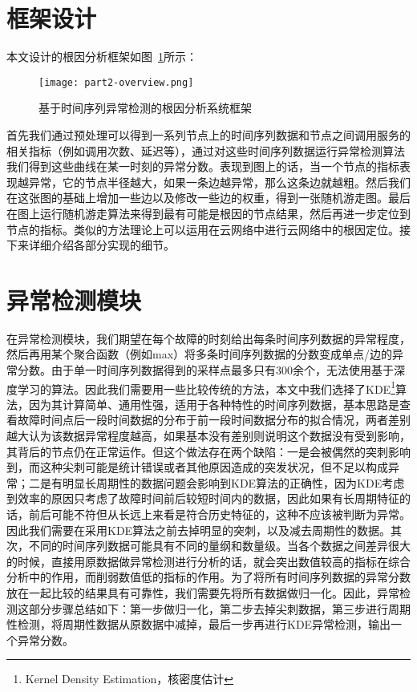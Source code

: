 \section{框架设计}
本文设计的根因分析框架如图~\ref{fig:part2-overview}所示：
\begin{figure}[htbp]
    \centering
    \texttt{[image: part2-overview.png]}
    \caption{基于时间序列异常检测的根因分析系统框架}
    \label{fig:part2-overview}
  \end{figure}

首先我们通过预处理可以得到一系列节点上的时间序列数据和节点之间调用服务的相关指标（例如调用次数、延迟等），通过对这些时间序列数据运行异常检测算法我们得到这些曲线在某一时刻的异常分数。表现到图上的话，当一个节点的指标表现越异常，它的节点半径越大，如果一条边越异常，那么这条边就越粗。然后我们在这张图的基础上增加一些边以及修改一些边的权重，得到一张随机游走图。最后在图上运行随机游走算法来得到最有可能是根因的节点结果，然后再进一步定位到节点的指标。类似的方法理论上可以运用在云网络中进行云网络中的根因定位。接下来详细介绍各部分实现的细节。
\section{异常检测模块}
在异常检测模块，我们期望在每个故障的时刻给出每条时间序列数据的异常程度，然后再用某个聚合函数（例如max）将多条时间序列数据的分数变成单点/边的异常分数。由于单一时间序列数据得到的采样点最多只有300余个，无法使用基于深度学习的算法。因此我们需要用一些比较传统的方法，本文中我们选择了KDE\footnote{Kernel Density Estimation，核密度估计}算法，因为其计算简单、通用性强，适用于各种特性的时间序列数据，基本思路是查看故障时间点后一段时间数据的分布于前一段时间数据分布的拟合情况，两者差别越大认为该数据异常程度越高，如果基本没有差别则说明这个数据没有受到影响，其背后的节点仍在正常运作。但这个做法存在两个缺陷：一是会被偶然的突刺影响到，而这种尖刺可能是统计错误或者其他原因造成的突发状况，但不足以构成异常；二是有明显长周期性的数据问题会影响到KDE算法的正确性，因为KDE考虑到效率的原因只考虑了故障时间前后较短时间内的数据，因此如果有长周期特征的话，前后可能不符但从长远上来看是符合历史特征的，这种不应该被判断为异常。因此我们需要在采用KDE算法之前去掉明显的突刺，以及减去周期性的数据。其次，不同的时间序列数据可能具有不同的量纲和数量级。当各个数据之间差异很大的时候，直接用原数据做异常检测进行分析的话，就会突出数值较高的指标在综合分析中的作用，而削弱数值低的指标的作用。为了将所有时间序列数据的异常分数放在一起比较的结果具有可靠性，我们需要先将所有数据做归一化。因此，异常检测这部分步骤总结如下：第一步做归一化，第二步去掉尖刺数据，第三步进行周期性检测，将周期性数据从原数据中减掉，最后一步再进行KDE异常检测，输出一个异常分数。
